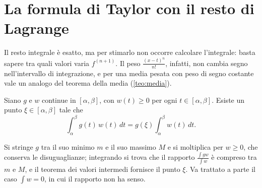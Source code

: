 \section{La formula di Taylor con il resto di Lagrange}
\label{sec:resto-lagrange}

Il resto integrale è esatto, ma per stimarlo non occorre calcolare l'integrale: basta
sapere tra quali valori varia $f^{(n+1)}$. Il peso $\frac{(x-t)^{n}}{n!}$, infatti, non cambia segno
nell'intervallo di integrazione, e per una media pesata con peso di segno costante vale
un analogo del teorema della media (\cref{teo:media}).

\begin{lemma}\label{lem:media-pesata}
Siano $g$ e $w$ continue in $[\alpha,\beta]$, con $w(t)\ge0$ per ogni $t\in[\alpha,\beta]$. Esiste un punto
$\xi\in[\alpha,\beta]$ tale che
\begin{equation}\label{eq:media-pesata}
  \int_{\alpha}^{\beta}g(t)\,w(t)\,dt=g(\xi)\int_{\alpha}^{\beta}w(t)\,dt .
\end{equation}
\end{lemma}

\begin{schema}
\end{schema}

\begin{strategia}
Si stringe $g$ tra il suo minimo $m$ e il suo massimo $M$ e si moltiplica per $w\ge0$, che
conserva le disuguaglianze; integrando si trova che il rapporto
$\frac{\int gw}{\int w}$ è compreso tra $m$ e $M$, e il teorema dei valori intermedi fornisce il
punto $\xi$. Va trattato a parte il caso $\int w=0$, in cui il rapporto non ha senso.
\end{strategia}

